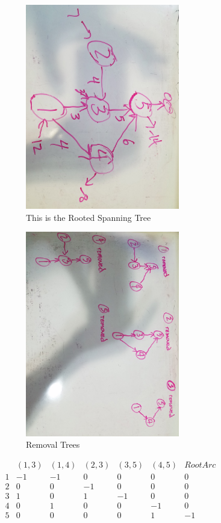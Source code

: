 \documentclass[11pt,a4paper,openany]{report}
\begin{document}
\begin{figure}[h]
  \centering
  \includegraphics[width=0.6\textwidth]{lp5_2_feasible}
  \caption{This is the Rooted Spanning Tree}
\end{figure}
\begin{figure}[h]
  \centering
  \includegraphics[width=0.6\textwidth]{lp5_2_removal}
  \caption{Removal Trees}
\end{figure}

$\begin{array}{r|rrrrrr}
      & (1,3) & (1,4) & (2,3) & (3,5) & (4,5) & Root Arc\\
    \hline
    1 & -1 & -1 & 0 & 0 & 0 & 0 \\
    2 & 0 & 0 & -1 & 0 & 0 & 0 \\
    3 & 1 & 0 & 1 & -1 & 0 & 0 \\
    4 & 0 & 1 & 0 & 0 & -1 & 0 \\
    5 & 0 & 0 & 0 & 0  & 1 & -1\\
\end{array}$
\end{document}
